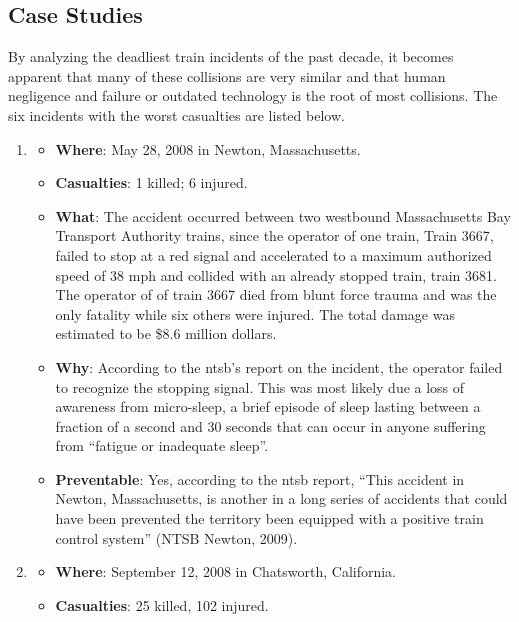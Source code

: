 \documentclass[11pt, titlepage]{article}
\begin{document}
\subsection{Case Studies}

By analyzing the deadliest train incidents of the past decade, it becomes
apparent that many of these collisions are very similar and that human negligence
and failure or outdated technology is the root of most collisions. The six
incidents with the worst casualties are listed below.

\begin{enumerate}
    \item
    \begin{itemize}
        \item \textbf{Where}: May 28, 2008 in Newton, Massachusetts.
        \item \textbf{Casualties}: 1 killed; 6 injured.
        \item \textbf{What}: The accident occurred between two westbound
        Massachusetts Bay Transport Authority trains, since the operator of one
        train, Train 3667, failed to stop at a red signal and accelerated to a
        maximum authorized speed of 38 mph and collided with an already stopped
        train, train 3681. The operator of  of train 3667 died from blunt force
        trauma and was the only fatality while six others were injured. The total
        damage was estimated to be \$8.6 million dollars.
        \item \textbf{Why}: According to the \gls{ntsb}’s report on the incident,
        the operator failed to recognize the stopping signal. This was most
        likely due a loss of awareness from micro-sleep, a brief episode of sleep
        lasting between a fraction of a second and 30 seconds that can occur in
        anyone suffering from ``fatigue or inadequate sleep''.
        \item \textbf{Preventable}: Yes, according to the \gls{ntsb} report,
        ``This accident in Newton, Massachusetts, is another in a long series of
        accidents that could have been prevented the territory been equipped with
        a positive train control system'' (NTSB Newton, 2009).
    \end{itemize}
    \item
    \begin{itemize}
        \item \textbf{Where}: September 12, 2008 in Chatsworth, California.
        \item \textbf{Casualties}: 25 killed, 102 injured.

\end{itemize}
\end{enumerate}
\end{document}
